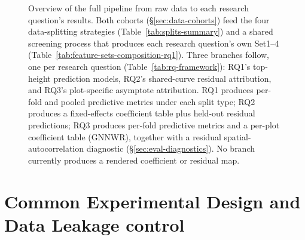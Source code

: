 \begin{figure}[!htbp]
\centering
{}
\caption{Overview of the full pipeline from raw data to each research question's results. Both
cohorts (\S\ref{sec:data-cohorts}) feed the four data-splitting strategies
(Table~\ref{tab:splits-summary}) and a shared screening process that produces each research
question's own Set1--4 (Table~\ref{tab:feature-sets-composition-rq1}). Three branches follow, one
per research question (Table~\ref{tab:rq-framework}): RQ1's top-height prediction models, RQ2's
shared-curve residual attribution, and RQ3's plot-specific asymptote attribution. RQ1 produces
per-fold and pooled predictive metrics under each split type; RQ2 produces a fixed-effects
coefficient table plus held-out residual predictions; RQ3 produces per-fold predictive metrics and
a per-plot coefficient table (GNNWR), together with a residual spatial-autocorrelation diagnostic
(\S\ref{sec:eval-diagnostics}). No branch currently produces a rendered coefficient or residual
map.}
\label{fig:pipeline-overview}
\end{figure}

\section{Common Experimental Design and Data Leakage control}
\label{sec:common-design}


